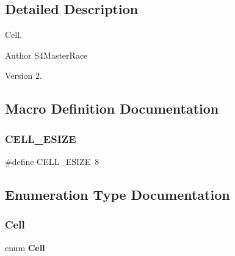 \subsection{Detailed Description}
Cell. 

\begin{DoxyAuthor}{Author}
S4\+Master\+Race 
\end{DoxyAuthor}
\begin{DoxyVersion}{Version}
2. 
\end{DoxyVersion}


\subsection{Macro Definition Documentation}
\mbox{\label{cell_8h_a87d2a1196530d0fb8198cb507229b1e2}} 
\subsubsection{C\+E\+L\+L\+\_\+\+E\+S\+I\+ZE}
{\footnotesize\ttfamily \#define C\+E\+L\+L\+\_\+\+E\+S\+I\+ZE~8}



\subsection{Enumeration Type Documentation}
\mbox{\label{cell_8h_a0133c02dfc35ffbaf07ad1a587dac4d1}} 
\subsubsection{Cell}
{\footnotesize\ttfamily enum \textbf{ Cell}}

